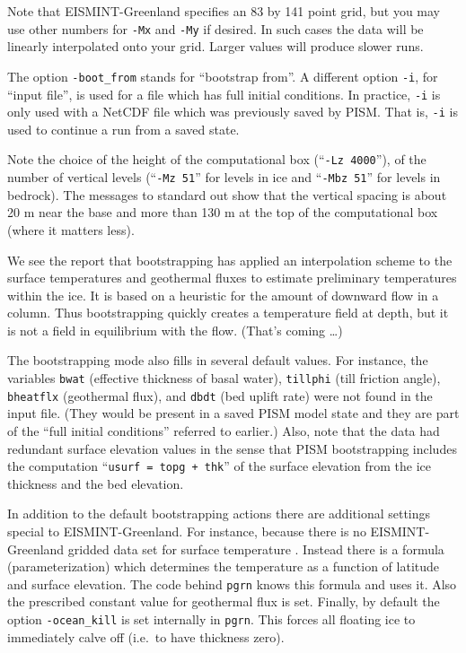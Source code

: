 \documentclass[11pt,final]{amsart}
\begin{document}
Note that EISMINT-Greenland specifies an 83 by 141 point grid, but you may use other numbers for \verb|-Mx| and \verb|-My| if desired.  In such cases the data will be linearly interpolated onto your grid.  Larger values will produce slower runs.

The option \verb|-boot_from| stands for ``bootstrap from''.  A different option \verb|-i|, for ``input file'', is used for a file which has full initial conditions.  In practice, \verb|-i| is only used with a NetCDF file which was previously saved by PISM.  That is, \verb|-i| is used to continue a run from a saved state.

Note the choice of the height of the computational box (``\verb|-Lz 4000|''), of the number of vertical levels (``\verb|-Mz 51|'' for levels in ice and ``\verb|-Mbz 51|'' for levels in bedrock). The messages to standard out show that the vertical spacing is about 20 m near the base and more than 130 m at the top of the computational box (where it matters less).

We see the report that bootstrapping has applied an interpolation scheme to the surface temperatures and geothermal fluxes to estimate preliminary temperatures within the ice.  It is based on a heuristic for the amount of downward flow in a column.  Thus bootstrapping quickly creates a temperature field at depth, but it is not a field in equilibrium with the flow.  (That's coming \dots)

The bootstrapping mode also fills in several default values.  For instance, the variables \verb|bwat| (effective thickness of basal water), \verb|tillphi| (till friction angle), \verb|bheatflx| (geothermal flux), and \verb|dbdt| (bed uplift rate) were not found in the input file.   (They would be present in a saved PISM model state and they are part of the ``full initial conditions'' referred to earlier.)  Also, note that the data had redundant surface elevation values in the sense that PISM bootstrapping includes the computation ``\verb|usurf = topg + thk|'' of the surface elevation from the ice thickness and the bed elevation.

In addition to the default bootstrapping actions there are additional settings special to EISMINT-Greenland.  For instance, because there is no EISMINT-Greenland gridded data set for surface temperature \cite{RitzEISMINT}.  Instead there is a formula (parameterization) which determines the temperature as a function of latitude and surface elevation.  The code behind \verb|pgrn| knows this formula and uses it.  Also the prescribed constant value for geothermal flux is set.  Finally, by default the option \verb|-ocean_kill| is set internally in \verb|pgrn|.  This forces all floating ice to immediately calve off (i.e.~to have thickness zero).
\end{document}
